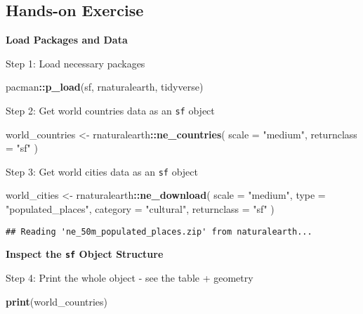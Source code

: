 \documentclass[
]{article}
\newenvironment{Shaded}{\begin{snugshade}}{\end{snugshade}}
\newcommand{\AttributeTok}[1]{\textcolor[rgb]{0.13,0.29,0.53}{#1}}
\newcommand{\FunctionTok}[1]{\textcolor[rgb]{0.13,0.29,0.53}{\textbf{#1}}}
\newcommand{\NormalTok}[1]{#1}
\newcommand{\OtherTok}[1]{\textcolor[rgb]{0.56,0.35,0.01}{#1}}
\newcommand{\SpecialCharTok}[1]{\textcolor[rgb]{0.81,0.36,0.00}{\textbf{#1}}}
\newcommand{\StringTok}[1]{\textcolor[rgb]{0.31,0.60,0.02}{#1}}
\begin{document}
\subsection{Hands-on Exercise}\label{hands-on-exercise}

\textbf{Load Packages and Data}

Step 1: Load necessary packages

\begin{Shaded}
\begin{Highlighting}[]
\NormalTok{pacman}\SpecialCharTok{::}\FunctionTok{p\_load}\NormalTok{(sf, rnaturalearth, tidyverse)}
\end{Highlighting}
\end{Shaded}

Step 2: Get world countries data as an \texttt{sf} object

\begin{Shaded}
\begin{Highlighting}[]
\NormalTok{world\_countries }\OtherTok{\textless{}{-}}\NormalTok{ rnaturalearth}\SpecialCharTok{::}\FunctionTok{ne\_countries}\NormalTok{(}
  \AttributeTok{scale =} \StringTok{"medium"}\NormalTok{, }\AttributeTok{returnclass =} \StringTok{"sf"}
\NormalTok{)}
\end{Highlighting}
\end{Shaded}

Step 3: Get world cities data as an \texttt{sf} object

\begin{Shaded}
\begin{Highlighting}[]
\NormalTok{world\_cities }\OtherTok{\textless{}{-}}\NormalTok{ rnaturalearth}\SpecialCharTok{::}\FunctionTok{ne\_download}\NormalTok{(}
  \AttributeTok{scale       =} \StringTok{"medium"}\NormalTok{,}
  \AttributeTok{type        =} \StringTok{"populated\_places"}\NormalTok{,}
  \AttributeTok{category    =} \StringTok{"cultural"}\NormalTok{,}
  \AttributeTok{returnclass =} \StringTok{"sf"}
\NormalTok{)}
\end{Highlighting}
\end{Shaded}

\begin{verbatim}
## Reading 'ne_50m_populated_places.zip' from naturalearth...
\end{verbatim}

\textbf{Inspect the \texttt{sf} Object Structure}

Step 4: Print the whole object - see the table + geometry

\begin{Shaded}
\begin{Highlighting}[]
\FunctionTok{print}\NormalTok{(world\_countries)}
\end{Highlighting}
\end{Shaded}
\end{document}
